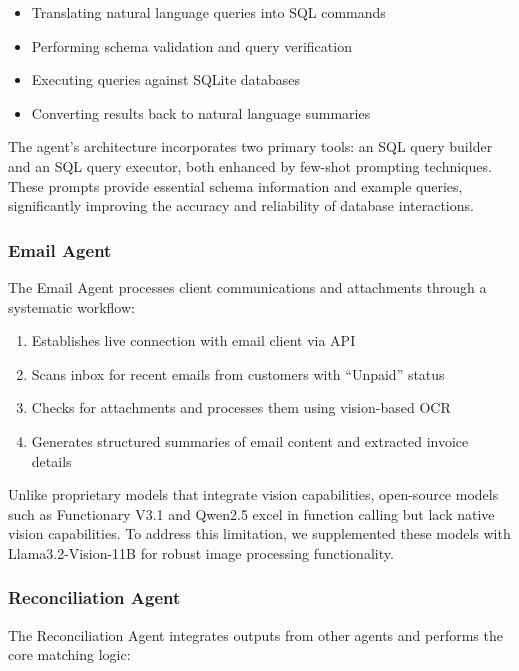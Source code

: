 \begin{itemize}[leftmargin=*]
    \item Translating natural language queries into SQL commands
    \item Performing schema validation and query verification
    \item Executing queries against SQLite databases
    \item Converting results back to natural language summaries
\end{itemize}

The agent's architecture incorporates two primary tools: an SQL query builder and an SQL query executor, both enhanced by few-shot prompting techniques. These prompts provide essential schema information and example queries, significantly improving the accuracy and reliability of database interactions.

\subsubsection{Email Agent}

The Email Agent processes client communications and attachments through a systematic workflow:

\begin{enumerate}[leftmargin=*]
    \item Establishes live connection with email client via API
    \item Scans inbox for recent emails from customers with ``Unpaid'' status
    \item Checks for attachments and processes them using vision-based OCR
    \item Generates structured summaries of email content and extracted invoice details
\end{enumerate}

Unlike proprietary models that integrate vision capabilities, open-source models such as Functionary V3.1 and Qwen2.5 excel in function calling but lack native vision capabilities. To address this limitation, we supplemented these models with Llama3.2-Vision-11B for robust image processing functionality.

\subsubsection{Reconciliation Agent}

The Reconciliation Agent integrates outputs from other agents and performs the core matching logic:

